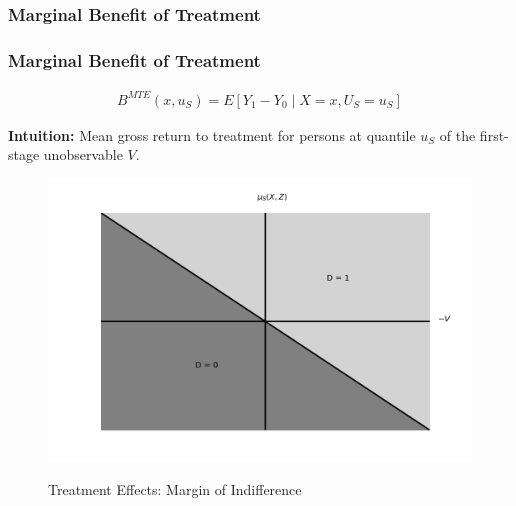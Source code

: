 \begin{frame}
    \subsubsection{Marginal Benefit of Treatment}\label{marginal-benefit-of-treatment}
\frametitle{Marginal Benefit of Treatment}

\begin{align*}
B^{MTE}(x, u_S) = E [Y_1 - Y_0 \mid X = x, U_S = u_S]
\end{align*}

\textbf{Intuition:} Mean gross return to treatment for persons at
quantile \(u_S\) of the first-stage unobservable \(V\).

\end{frame}


\begin{frame}

\begin{figure}[htp]\centering
	\caption{Treatment Effects: Margin of Indifference}\label{Margin Indifference}\scalebox{0.35}
	{\includegraphics{./material/fig-margin-indifference.png}}
\end{figure}

\end{frame}


